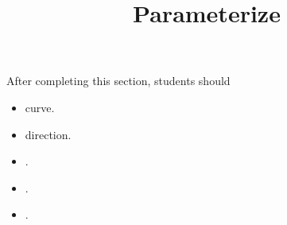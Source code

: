 \documentclass{ximera}
\title{Parameterize}
\begin{document}
\begin{abstract}
\end{abstract}
\maketitle

\begin{sectionOutcomes}
After completing this section, students should 

\begin{itemize}
\item curve.
\item direction.
\item .
\item .
\item .
\end{itemize}
\end{sectionOutcomes}
\end{document}
